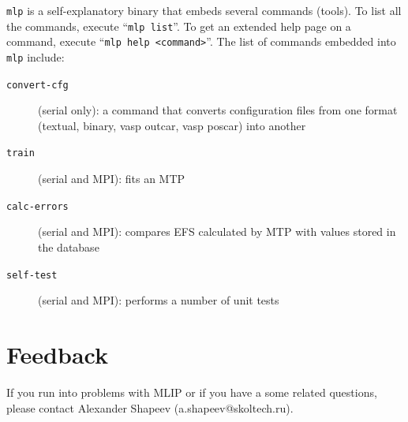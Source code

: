 \documentclass[12pt]{article}
\renewcommand{\_}{\char`_}
\begin{document}
\texttt{mlp} is a self-explanatory binary that embeds several commands (tools).
To list all the commands, execute ``\texttt{mlp list}''.
To get an extended help page on a command, execute ``\texttt{mlp help <command>}''.
The list of commands embedded into \texttt{mlp} include:
\begin{description}
\item[\texttt{convert-cfg}] (serial only): a command that converts configuration files from one format (textual, binary, vasp outcar, vasp poscar) into another

\item[\texttt{train}] (serial and MPI): fits an MTP

\item[\texttt{calc-errors}]  (serial and MPI): compares EFS calculated by MTP with values stored in the database

\item[\texttt{self-test}]  (serial and MPI): performs a number of unit tests
\end{description}


\section{Feedback}
If you run into problems with MLIP or if you have a some related questions, please contact Alexander Shapeev (a.shapeev@skoltech.ru).


\end{document}
